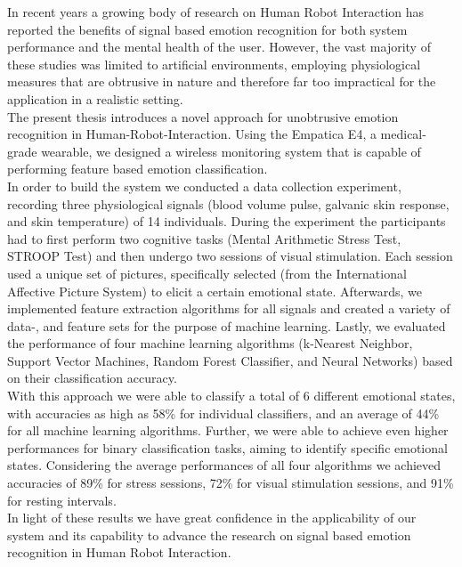 

In recent years a growing body of research on Human Robot Interaction has reported the benefits of signal based emotion recognition for both system performance and the mental health of the user. However, the vast majority of these studies was limited to artificial environments, employing physiological measures that are obtrusive in nature and therefore far too impractical for the application in a realistic setting.\\
The present thesis introduces a novel approach for unobtrusive emotion recognition in Human-Robot-Interaction. Using the Empatica E4, a medical-grade wearable, we designed a wireless monitoring system that is capable of performing feature based emotion classification.\\
In order to build the system we conducted a data collection experiment, recording three physiological signals (blood volume pulse, galvanic skin response, and skin temperature) of 14 individuals. During the experiment the participants had to first perform two cognitive tasks (Mental Arithmetic Stress Test, STROOP Test) and then undergo two sessions of visual stimulation. Each session used a unique set of pictures, specifically selected (from the International Affective Picture System) to elicit a certain emotional state.
Afterwards, we implemented feature extraction algorithms for all signals and created a variety of data-, and feature sets for the purpose of machine learning.
Lastly, we evaluated the performance of four machine learning algorithms (k-Nearest Neighbor, Support Vector Machines, Random Forest Classifier, and Neural Networks) based on their classification accuracy.\\
With this approach we were able to classify a total of 6 different emotional states, with accuracies as high as 58\% for individual classifiers, and an average of 44\% for all machine learning algorithms. 
Further, we were able to achieve even higher performances for binary classification tasks, aiming to identify specific emotional states. Considering the average performances of all four algorithms we achieved accuracies of 89\% for stress sessions, 72\% for visual stimulation sessions, and 91\% for resting intervals.\\ 
In light of these results we have great confidence in the applicability of our system and its capability to advance the research on signal based emotion recognition in Human Robot Interaction.  
